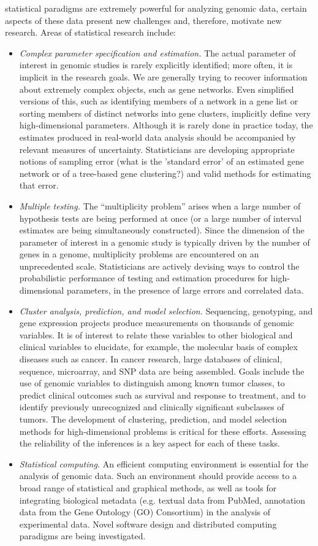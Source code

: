 \documentclass{amsart}
\begin{document}
statistical paradigms are extremely powerful for analyzing genomic
data, certain aspects of these data present new challenges and,
therefore, motivate new research.  Areas of statistical research
include:
\begin{itemize}
\item {\em Complex parameter specification and estimation.}  The
actual parameter of interest in genomic studies is rarely explicitly
identified; more often, it is implicit in the research goals. We are
generally trying to recover information about extremely complex
objects, such as gene networks.  Even simplified versions of this,
such as identifying members of a network in a gene list or sorting
members of distinct networks into gene clusters, implicitly define
very high-dimensional parameters.  Although it is rarely done in
practice today, the estimates produced in real-world data analysis
should be accompanied by relevant measures of uncertainty.
Statisticians are developing appropriate notions of sampling error
(what is the 'standard error' of an estimated gene network or of a
tree-based gene clustering?) and valid methods for estimating that
error.
\item {\em Multiple testing.}  The ``multiplicity problem'' arises
when a large number of hypothesis tests are being performed at once
(or a large number of interval estimates are being simultaneously
constructed).  Since the dimension of the parameter of interest in a
genomic study is typically driven by the number of genes in a genome,
multiplicity problems are encountered on an unprecedented scale.
Statisticians are actively devising ways to control the probabilistic
performance of testing and estimation procedures for high-dimensional
parameters, in the presence of large errors and correlated data.
\item {\em Cluster analysis, prediction, and model selection.}
Sequencing, genotyping, and gene expression projects produce
measurements on thousands of genomic variables. It is of interest to
relate these variables to other biological and clinical variables to
elucidate, for example, the molecular basis of complex diseases such
as cancer. In cancer research, large databases of clinical, sequence,
microarray, and SNP data are being assembled. Goals include the use of
genomic variables to distinguish among known tumor classes, to predict
clinical outcomes such as survival and response to treatment, and to
identify previously unrecognized and clinically significant subclasses
of tumors. The development of clustering, prediction, and model
selection methods for high-dimensional problems is critical for these
efforts.  Assessing the reliability of the inferences is a key aspect
for each of these tasks.
\item {\em Statistical computing.} An efficient computing environment
is essential for the analysis of genomic data. Such an environment
should provide access to a broad range of statistical and graphical
methods, as well as tools for integrating biological metadata
(e.g. textual data from PubMed, annotation data from the Gene Ontology
(GO) Consortium) in the analysis of experimental data. Novel software
design and distributed computing paradigms are being investigated.  
\end{itemize}
\end{document}
